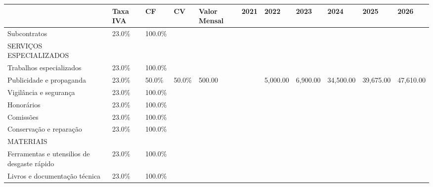 \documentclass[11pt]{article}
\begin{document}
	\tiny
	\begin{adjustbox}{center}
		\begin{tabular}{|l|l|l|l|l|l|l|l|l|l|l|}
			\hline
			& Taxa IVA & CF      & CV     & Valor Mensal & 2021 & 2022      & 2023      & 2024       & 2025       & 2026       \\ \hline
			Subcontratos                                & 23.0\%   & 100.0\% &        &              &      &           &           &            &            &            \\ \hline
			SERVIÇOS ESPECIALIZADOS                    &          &         &        &              &      &           &           &            &            &            \\ \hline
			Trabalhos especializados                    & 23.0\%   & 100.0\% &        &              &      &           &           &            &            &            \\ \hline
			Publicidade e propaganda                    & 23.0\%   & 50.0\%  & 50.0\% & 500.00       &      & 5,000.00  & 6,900.00  & 34,500.00  & 39,675.00  & 47,610.00  \\ \hline
			Vigilância e segurança                      & 23.0\%   & 100.0\% &        &              &      &           &           &            &            &            \\ \hline
			Honorários                                  & 23.0\%   & 100.0\% &        &              &      &           &           &            &            &            \\ \hline
			Comissões                                   & 23.0\%   & 100.0\% &        &              &      &           &           &            &            &            \\ \hline
			Conservação e reparação                     & 23.0\%   & 100.0\% &        &              &      &           &           &            &            &            \\ \hline
			MATERIAIS                                   &          &         &        &              &      &           &           &            &            &            \\ \hline
			Ferramentas e utensilios de desgaste rápido & 23.0\%   & 100.0\% &        &              &      &           &           &            &            &            \\ \hline
			Livros e documentação técnica               & 23.0\%   & 100.0\% &        &              &      &           &           &            &            &            \\ \hline

\end{tabular}
\end{adjustbox}
\end{document}
